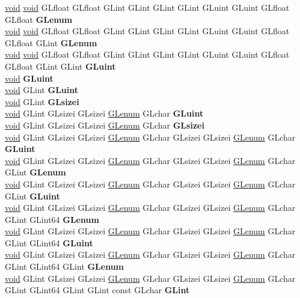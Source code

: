 \begin{DoxyCompactItemize}
\begin{tabbing}
\>\hyperlink{interfacevoid}{void} \hyperlink{interfacevoid}{void} GLfloat GLfloat GLint GLint GLint GLint GLuint GLuint GLfloat GLfloat {\bfseries GLenum}\\
\>\hyperlink{interfacevoid}{void} \hyperlink{interfacevoid}{void} GLfloat GLfloat GLint GLint GLint GLint GLuint GLuint GLfloat GLfloat GLint {\bfseries GLenum}\\
\>\hyperlink{interfacevoid}{void} \hyperlink{interfacevoid}{void} GLfloat GLfloat GLint GLint GLint GLint GLuint GLuint GLfloat GLfloat GLint GLint {\bfseries GLuint}\\
\>\hyperlink{interfacevoid}{void} {\bfseries GLuint}\\
\>\hyperlink{interfacevoid}{void} GLint {\bfseries GLuint}\\
\>\hyperlink{interfacevoid}{void} GLint {\bfseries GLsizei}\\
\>\hyperlink{interfacevoid}{void} GLint GLsizei GLsizei \hyperlink{interfacevoid}{GLenum} GLchar {\bfseries GLuint}\\
\>\hyperlink{interfacevoid}{void} GLint GLsizei GLsizei \hyperlink{interfacevoid}{GLenum} GLchar {\bfseries GLsizei}\\
\>\hyperlink{interfacevoid}{void} GLint GLsizei GLsizei \hyperlink{interfacevoid}{GLenum} GLchar GLsizei GLsizei \hyperlink{interfacevoid}{GLenum} GLchar {\bfseries GLuint}\\
\>\hyperlink{interfacevoid}{void} GLint GLsizei GLsizei \hyperlink{interfacevoid}{GLenum} GLchar GLsizei GLsizei \hyperlink{interfacevoid}{GLenum} GLchar GLint {\bfseries GLenum}\\
\>\hyperlink{interfacevoid}{void} GLint GLsizei GLsizei \hyperlink{interfacevoid}{GLenum} GLchar GLsizei GLsizei \hyperlink{interfacevoid}{GLenum} GLchar GLint {\bfseries GLuint}\\
\>\hyperlink{interfacevoid}{void} GLint GLsizei GLsizei \hyperlink{interfacevoid}{GLenum} GLchar GLsizei GLsizei \hyperlink{interfacevoid}{GLenum} GLchar GLint GLint64 {\bfseries GLenum}\\
\>\hyperlink{interfacevoid}{void} GLint GLsizei GLsizei \hyperlink{interfacevoid}{GLenum} GLchar GLsizei GLsizei \hyperlink{interfacevoid}{GLenum} GLchar GLint GLint64 {\bfseries GLuint}\\
\>\hyperlink{interfacevoid}{void} GLint GLsizei GLsizei \hyperlink{interfacevoid}{GLenum} GLchar GLsizei GLsizei \hyperlink{interfacevoid}{GLenum} GLchar GLint GLint64 GLint {\bfseries GLenum}\\
\>\hyperlink{interfacevoid}{void} GLint GLsizei GLsizei \hyperlink{interfacevoid}{GLenum} GLchar GLsizei GLsizei \hyperlink{interfacevoid}{GLenum} GLchar GLint GLint64 GLint GLint const GLchar {\bfseries GLint}\\

\end{tabbing}
\end{DoxyCompactItemize}
